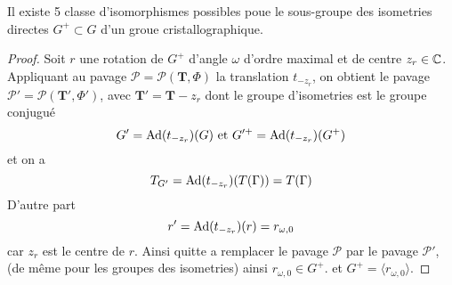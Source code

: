 \begin{theorem}
	Il existe 5 classe d'isomorphismes possibles poue le sous-groupe des
	isometries directes $G^+ \subset G$ d'un groue cristallographique.
\end{theorem}
\begin{proof}
	Soit $r$ une rotation de $G^+$ d'angle $\omega$ d'ordre maximal
	et de centre $z_r \in \mathbb{C}$.
	Appliquant au pavage $\mathcal{P} = \mathcal{P}(\mathbf{T}, \Phi)$ la
	translation $t_{-z_r}$, on obtient le pavage
	$\mathcal{P}' = \mathcal{P}(\mathbf{T}', \Phi')$, avec
	$\mathbf{T}' = \mathbf{T} - z_r$ dont le groupe d'isometries est le groupe
	conjugué
	\begin{equation*}
		G' = \operatorname{Ad}(t_{-z_r})(G) \textrm{ et } G'^+ = \operatorname{Ad}(t_{-z_r})(G^+) 
	\end{equation*}
	et on a 
	\begin{equation*}
		T_{G'} = \operatorname{Ad}(t_{-z_r})(T(\Gamma)) = T(\Gamma)
	\end{equation*}
	D'autre part
	\begin{equation*}
		r' = \operatorname{Ad}(t_{-z_r})(r) = r_{\omega, 0}
	\end{equation*}
	car $z_r$ est le centre de $r$. Ainsi quitte a remplacer le pavage
	$\mathcal{P}$ par le pavage $\mathcal{P}'$, (de même pour les groupes des
	isometries) ainsi $r_{\omega, 0} \in G^+$. et
	$G^+ = \langle r_{\omega, 0} \rangle$.


\end{proof}
